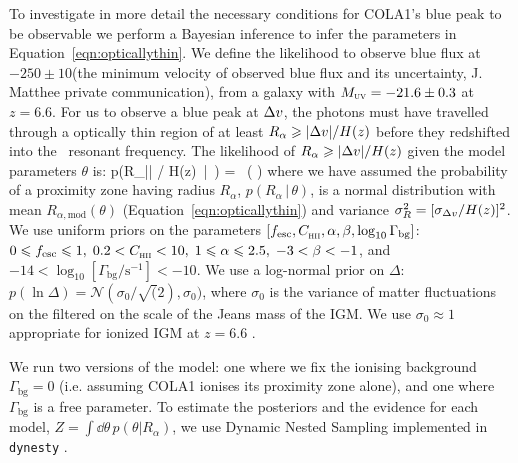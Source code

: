 \documentclass[fleqn,usenatbib]{mnras}
\begin{document}
To investigate in more detail the necessary conditions for COLA1's blue peak to be observable we perform a Bayesian inference to infer the parameters in Equation~\eqref{eqn:opticallythin}. We define the likelihood to observe blue \lya flux at $-250\pm10$\kms (the minimum velocity of observed blue flux and its uncertainty, J. Matthee private communication), from a galaxy with $\MUV = -21.6\pm0.3$ at $z=6.6$. For us to observe a blue peak at $\DV$, the photons must have travelled through a optically thin region of at least $R_\alpha \geq |\DV| / H(z)$ before they redshifted into the \lya\ resonant frequency. The likelihood of $R_\alpha \geq |\DV| / H(z)$ given the model parameters $\theta$ is:
%
\BE \label{eqn:like}
p(R_\alpha \geq |\DV| / H(z) \,|\, \theta) =  \, \left( \right)
\EE
%
where we have assumed the probability of a proximity zone having radius $R_\alpha$, $p(R_\alpha \,|\, \theta)$, is a normal distribution with mean $R_{\alpha,\mathrm{mod}}(\theta)$ (Equation~\ref{eqn:opticallythin}) and variance $\sigma_R^2 = [\sigma_{\DV}/H(z)]^2$. We use uniform priors on the parameters $[\fesc, \clump, \alpha, \beta, \log_{10}\Gamma_\mathrm{bg}]$: $0 \leq \fesc \leq 1, \; 0.2 < \clump < 10, \; 1 \leq \alpha \leq 2.5, \;-3 < \beta < -1$, and $-14 < \log_{10}[\Gamma_\mathrm{bg}/\mathrm{s}^{-1}] <-10$. We use a log-normal prior on $\Delta$: $p(\ln{\Delta}) = \mathcal{N}(\sigma_0/\sqrt(2), \sigma_0)$, where $\sigma_0$ is the variance of matter fluctuations on the filtered on the scale of the Jeans mass of the IGM. We use $\sigma_0 \approx 1$ appropriate for ionized IGM at $z=6.6$ \citep[e.g.,][]{Bi1997,Bi2003}.

We run two versions of the model: one where we fix the ionising background $\Gamma_\mathrm{bg} = 0$ (i.e. assuming COLA1 ionises its proximity zone alone), and one where $\Gamma_\mathrm{bg}$ is a free parameter. To estimate the posteriors and the evidence for each model, $Z = \int \dd \theta \, p(\theta | R_\alpha)$, we use Dynamic Nested Sampling implemented in \verb|dynesty| \citep{Speagle2019}.
\end{document}
